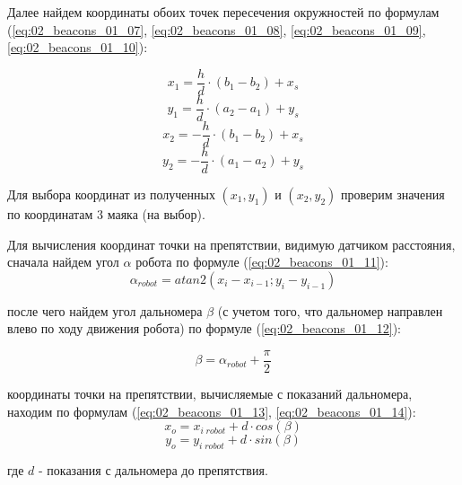 Далее найдем координаты обоих точек пересечения окружностей по формулам (\ref{eq:02_beacons_01_07}, \ref{eq:02_beacons_01_08}, \ref{eq:02_beacons_01_09}, \ref{eq:02_beacons_01_10}):

\begin{equation}
x_1 = \frac{h}{d} \cdot (b_1 - b_2)+x_s
\label{eq:02_beacons_01_07}
\end{equation}
\begin{equation}
y_1 = \frac{h}{d} \cdot (a_2 - a_1)+y_s
\label{eq:02_beacons_01_08}
\end{equation}
\begin{equation}
x_2 = -\frac{h}{d} \cdot (b_1 - b_2)+x_s
\label{eq:02_beacons_01_09}
\end{equation}
\begin{equation}
y_2 = -\frac{h}{d} \cdot (a_1 - a_2)+y_s
\label{eq:02_beacons_01_10}
\end{equation}

Для выбора координат из полученных $(x_1, y_1)$ и $(x_2, y_2)$ проверим значения по координатам 3 маяка (на выбор).

Для вычисления координат точки на препятствии, видимую датчиком расстояния, сначала найдем угол $\alpha$ робота по формуле (\ref{eq:02_beacons_01_11}):
\begin{equation}
	\alpha_{robot} = atan2(x_i - x_{i-1};  y_i - y_{i-1})
	\label{eq:02_beacons_01_11}
\end{equation}

после чего найдем угол дальномера $\beta$ (с учетом того, что дальномер направлен влево по ходу движения робота) по формуле (\ref{eq:02_beacons_01_12}):

\begin{equation}
	\beta = \alpha_{robot} + \frac{\pi}{2}
	\label{eq:02_beacons_01_12}
\end{equation}

координаты точки на препятствии, вычисляемые с показаний дальномера, находим по формулам (\ref{eq:02_beacons_01_13}, \ref{eq:02_beacons_01_14}):
\begin{equation}
	x_o = x_{i\;robot} + d \cdot cos(\beta)
	\label{eq:02_beacons_01_13}
\end{equation}
\begin{equation}
	y_o = y_{i\;robot} + d \cdot sin(\beta)
	\label{eq:02_beacons_01_14}
\end{equation}

где $d$ - показания с дальномера до препятствия.
\\

